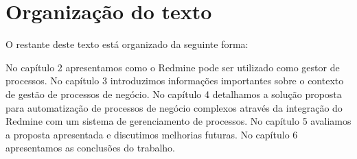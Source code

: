 \section{Organização do texto}\label{sec:introducao-organizacao_texto}

O restante deste texto está organizado da seguinte forma: 

No capítulo 2 apresentamos como o Redmine pode ser utilizado como gestor de processos. No capítulo 3 introduzimos informações importantes sobre o contexto de gestão de processos de negócio. No capítulo 4 detalhamos a solução proposta para automatização de processos de negócio complexos através da integração do Redmine com um sistema de gerenciamento de processos. No capítulo 5 avaliamos a proposta apresentada e discutimos melhorias futuras. No capítulo 6 apresentamos as conclusões do trabalho.